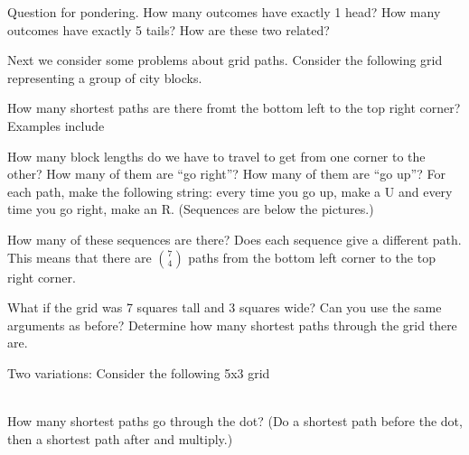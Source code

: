 \documentclass[14,fleqn]{article}
\begin{document}
Question for pondering. How many outcomes have exactly 1 head? How many outcomes have exactly 5 tails? How are these two related?

Next we consider some problems about grid paths. Consider the following grid representing a group of city blocks.
\begin{center}
\end{center}
How many shortest paths are there fromt the bottom left to the top right corner? Examples include
\begin{center}
\hfill
{}
\hfill
{}

\end{center}

How many block lengths do we have to travel to get from one corner to the other? How many of them are ``go right''? How many of them are ``go up''? For each path, make the following string: every time you go up, make a U and every time you go right, make an R. (Sequences are below the pictures.)

How many of these sequences are there? Does each sequence give a different path. This means that there are $\binom{7}{4}$ paths from the bottom left corner to the top right corner.

What if the grid was 7 squares tall and 3 squares wide? Can you use the same arguments as before? Determine how many shortest paths through the grid there are.

Two variations: Consider the following 5x3 grid\\
\\
How many shortest paths go through the dot? (Do a shortest path before the dot, then a shortest path after and multiply.)\\
\end{document}
